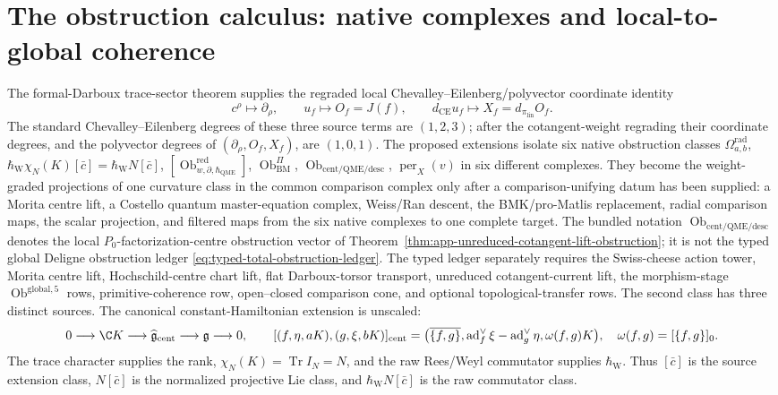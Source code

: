 \section{The obstruction calculus: native complexes and local-to-global coherence}\label{sec:obstruction-calculus}\label{app:master-deformation-complex}

The formal-Darboux trace-sector theorem supplies the regraded local
Chevalley--Eilenberg/polyvector coordinate identity
\[
  c^\rho\longmapsto\partial_\rho,\qquad
  u_f\longmapsto O_f=J(f),\qquad
  d_{\mathrm{CE}}u_f\longmapsto X_f=d_{\pi_{\mathrm{lin}}}O_f.
\]
The standard Chevalley--Eilenberg degrees of these three source terms
are \((1,2,3)\); after the cotangent-weight regrading their coordinate
degrees, and the polyvector degrees of
\((\partial_\rho,O_f,X_f)\), are \((1,0,1)\).  The proposed extensions
isolate six native
obstruction classes
\(\Omega^{\mathrm{rad}}_{a,b}\),
\(\hbar_{\mathrm{W}}\chi_N(K)[\bar c]
=\hbar_{\mathrm{W}}N[\bar c]\),
\([\operatorname{Ob}^{\mathrm{red}}_{w,\partial,\hbar_{\mathrm{QME}}}]\),
\(\operatorname{Ob}^{\Pi}_{\mathrm{BM}}\),
\(\operatorname{Ob}_{\mathrm{cent/QME/desc}}\),
\(\operatorname{per}_X(v)\) in six different complexes.  They become
the weight-graded projections of one curvature class in the common
comparison complex only after a comparison-unifying datum has been
supplied: a Morita centre lift, a
Costello quantum master-equation complex, Weiss/Ran descent, the
BMK/pro-Matlis replacement, radial comparison maps, the scalar
projection, and filtered maps from the six native complexes to one
complete target.  The bundled notation
\(\operatorname{Ob}_{\mathrm{cent/QME/desc}}\) denotes the local
\(P_0\)-factorization-centre obstruction vector of
Theorem~\ref{thm:app-unreduced-cotangent-lift-obstruction}; it is not
the typed global Deligne obstruction ledger
\eqref{eq:typed-total-obstruction-ledger}.  The typed ledger separately
requires the Swiss-cheese action tower, Morita centre lift,
Hochschild-centre chart lift, flat Darboux-torsor transport, unreduced
cotangent-current lift, the morphism-stage
\(\operatorname{Ob}^{\mathrm{global},5}\) rows, primitive-coherence
row, open--closed comparison cone, and optional topological-transfer
rows.
The second class has three distinct sources.  The canonical
constant-Hamiltonian extension is unscaled:
\[
  0\longrightarrow\C K\longrightarrow
  \widehat{\mathfrak g}_{\mathrm{cent}}
  \longrightarrow\mathfrak g\longrightarrow0,
  \qquad
  [(f,\eta,aK),(g,\xi,bK)]_{\mathrm{cent}}
  =\bigl(\overline{\{f,g\}},
  \operatorname{ad}^{\vee}_f\xi-\operatorname{ad}^{\vee}_g\eta,
  \omega(f,g)K\bigr),
  \quad \omega(f,g)=[\{f,g\}]_0.
\]
The trace character supplies the rank,
\(\chi_N(K)=\operatorname{Tr}I_N=N\), and the raw Rees/Weyl
commutator supplies \(\hbar_{\mathrm W}\).  Thus \([\bar c]\) is the
source extension class, \(N[\bar c]\) is the normalized projective Lie
class, and \(\hbar_{\mathrm W}N[\bar c]\) is the raw commutator class.

